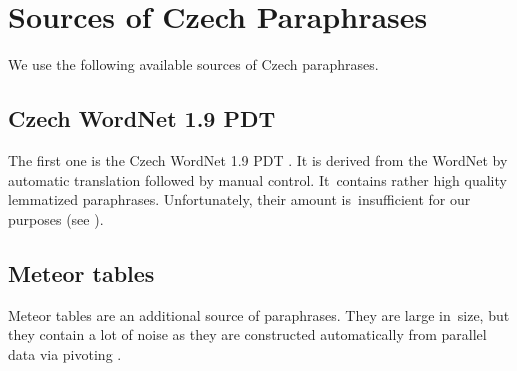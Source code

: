%
%
%

\section{Sources of Czech Paraphrases}
We use the following available sources of Czech paraphrases.

\subsection{Czech WordNet 1.9 PDT}
The first one is the Czech WordNet 1.9 PDT \citep{czech-wordnet}. It is derived 
from the WordNet \cite{wordnet} by automatic translation followed by manual 
control. It~contains rather high quality lemmatized paraphrases. Unfortunately, 
their amount is~insufficient for our purposes (see ). 


\subsection{Meteor tables} %
\label{meteori}
Meteor tables \citep{meteor-tables} are an additional source of paraphrases. 
They are large in~size, but they contain a lot of noise as they are constructed automatically 
from parallel data via pivoting \citep{pivoting}. 

